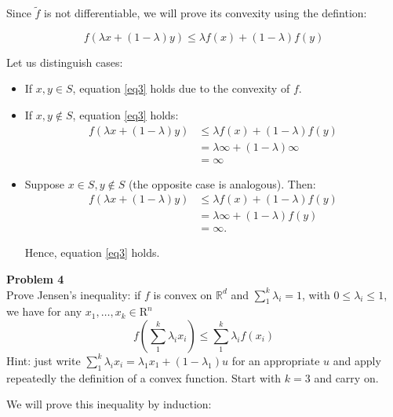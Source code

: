 \documentclass[11pt,table]{article}
\newcommand{\R}{\mathbb{R}}
\newenvironment{problem}[2][Problem]
{ \begin{mdframed}[backgroundcolor=gray!20] \textbf{#1 #2} \\ }
	{  \end{mdframed} }
\begin{document}
	Since $\tilde f$ is not differentiable, we will prove its convexity using the defintion: 
	
	\begin{equation}
		\label{eq3}
		f(\lambda x + (1 - \lambda)y) \leq \lambda f(x) + (1 - \lambda) f(y)
	\end{equation}
	
	Let us distinguish cases:
	
	\begin{itemize}
		\item If $x,y \in S$, equation \ref{eq3} holds due to the convexity of $f$.
		
		\item If $x,y \notin S$, equation \ref{eq3} holds:
		\begin{align*}
			f(\lambda x + (1 - \lambda)y) & \le \lambda f(x) + (1 - \lambda) f(y) \\
			& = \lambda \infty + (1 - \lambda) \infty \\
			& = \infty
		\end{align*}
		
		\item Suppose $x \in S, y \notin S$ (the opposite case is analogous). Then:
		\begin{align*}
			f(\lambda x + (1 - \lambda)y) & \le \lambda f(x) + (1 - \lambda) f(y) \\
			& = \lambda \infty + (1 - \lambda) f(y) \\
			& = \infty.
		\end{align*}
		
		Hence, equation \ref{eq3} holds. \\
	\end{itemize}
	
	\begin{problem}{4}
		Prove Jensen's inequality: if $f$ is convex on $\R^{d}$ and $\sum_{1}^{k} \lambda_{i}=1$, with $0 \leq \lambda_{i} \leq 1$, we have for any $x_{1}, \ldots, x_{k} \in \mathrm{R}^{n}$
		\[
		f\left(\sum_{1}^{k} \lambda_{i} x_{i}\right) \leq \sum_{1}^{k} \lambda_{i} f\left(x_{i}\right)
		\]
		Hint: just write $\sum_{1}^{k} \lambda_{i} x_{i}=\lambda_{1} x_{1}+\left(1-\lambda_{1}\right)u$  for an appropriate $u$ and apply repeatedly the definition of a convex function. Start with $k=3$ and carry on.
	\end{problem}
	
	We will prove this inequality by induction:
	
\end{document}
